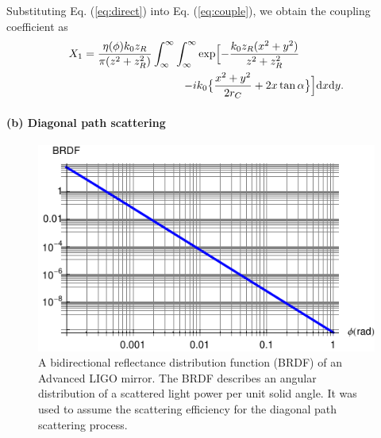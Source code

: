 Substituting Eq. (\ref{eq:direct}) into Eq. (\ref{eq:couple}),
we obtain the coupling coefficient as
\begin{eqnarray}
\begin{split}
X_1= \frac{\eta(\phi) k_0 z_R}{\pi (z^2+z_R^2)} \int_{\infty}^{\infty} \int_{\infty}^{\infty}
\exp \Bigl[-\frac{k_0 z_R (x^2 + y^2)} {z^2+z_R^2} \qquad \qquad  \\
-i k_0\bigl\{ \frac{x^2 + y^2}{2 r_C}  %
+2 x \tan\alpha \bigr\} \Bigr] {\rm d}x {\rm d}y.
\end{split}
\end{eqnarray}


\paragraph{(b) Diagonal path scattering}

\begin{figure}
\centering
\includegraphics[scale =1]{./Sec_Optics/BRDF-plot.pdf}
\caption{A bidirectional reflectance distribution function (BRDF) of an Advanced LIGO mirror.
The BRDF describes an angular distribution of a scattered light power per
unit solid angle. It was used to assume the scattering efficiency for the
diagonal path scattering process.}
\label{fig:BRDF}
\end{figure}



